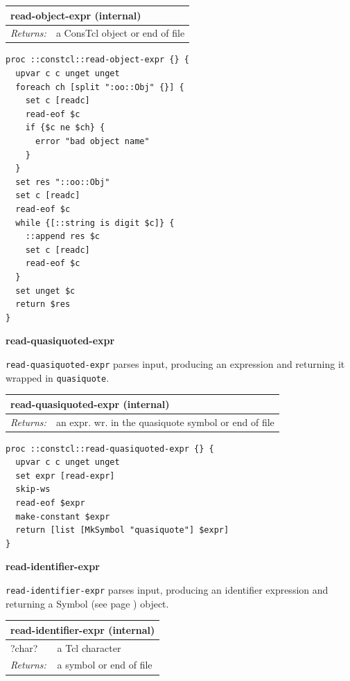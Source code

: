 \documentclass[twoside,9pt]{report}
\begin{document}
\begin{tabular}{ |l l| }
\hline
\multicolumn{2}{|l|}{read-object-expr (internal)} \\
\hline
\textit{Returns:} & a ConsTcl object or end of file \\
\hline
\end{tabular}

\noindent\makebox[\linewidth]{\rule{\linewidth}{0.4pt}}
\begin{lstlisting}
proc ::constcl::read-object-expr {} {
  upvar c c unget unget
  foreach ch [split ":oo::Obj" {}] {
    set c [readc]
    read-eof $c
    if {$c ne $ch} {
      error "bad object name"
    }
  }
  set res "::oo::Obj"
  set c [readc]
  read-eof $c
  while {[::string is digit $c]} {
    ::append res $c
    set c [readc]
    read-eof $c
  }
  set unget $c
  return $res
}
\end{lstlisting}
\noindent\makebox[\linewidth]{\rule{\linewidth}{0.4pt}}

\textbf{read-quasiquoted-expr}


\texttt{read-quasiquoted-expr} parses input, producing an expression and returning it wrapped in \texttt{quasiquote}.

\begin{tabular}{ |l l| }
\hline
\multicolumn{2}{|l|}{read-quasiquoted-expr (internal)} \\
\hline
\textit{Returns:} & an expr. wr. in the quasiquote symbol or end of file \\
\hline
\end{tabular}

\noindent\makebox[\linewidth]{\rule{\linewidth}{0.4pt}}
\begin{lstlisting}
proc ::constcl::read-quasiquoted-expr {} {
  upvar c c unget unget
  set expr [read-expr]
  skip-ws
  read-eof $expr
  make-constant $expr
  return [list [MkSymbol "quasiquote"] $expr]
}
\end{lstlisting}
\noindent\makebox[\linewidth]{\rule{\linewidth}{0.4pt}}

\textbf{read-identifier-expr}


\texttt{read-identifier-expr} parses input, producing an identifier expression and returning a Symbol (see page \pageref{symbols}) object.

\begin{tabular}{ |l l| }
\hline
\multicolumn{2}{|l|}{read-identifier-expr (internal)} \\
\hline
?char? & a Tcl character \\
\textit{Returns:} & a symbol or end of file \\
\hline
\end{tabular}
\end{document}
